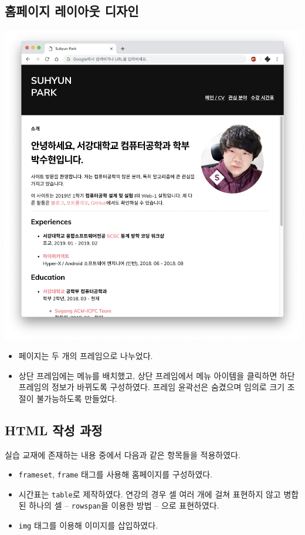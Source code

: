 \documentclass[runningheads]{llncs}
\newenvironment{Figure}
  {\par\medskip\noindent\minipage{\linewidth}}
  {\endminipage\par\medskip}
\begin{document}
\subsection{홈페이지 레이아웃 디자인}
\begin{Figure}
	\includegraphics[width=\linewidth]{web-html.png}
	\label{fig:web-html}
\end{Figure}

\begin{itemize}
	\item 페이지는 두 개의 프레임으로 나누었다.
	\item 상단 프레임에는 메뉴를 배치했고, 상단 프레임에서 메뉴 아이템을 클릭하면 하단 프레임의 정보가 바뀌도록 구성하였다. 프레임 윤곽선은 숨겼으며 임의로 크기 조절이 불가능하도록 만들었다.
\end{itemize}


\subsection{HTML 작성 과정}
실습 교재에 존재하는 내용 중에서 다음과 같은 항목들을 적용하였다.
\begin{itemize}
	\item \texttt{frameset}, \texttt{frame} 태그를 사용해 홈페이지를 구성하였다.
	\item 시간표는 \texttt{table}로 제작하였다. 연강의 경우 셀 여러 개에 걸쳐 표현하지 않고 병합된 하나의 셀 -- \texttt{rowspan}을 이용한 방법 -- 으로 표현하였다.
	\item \texttt{img} 태그를 이용해 이미지를 삽입하였다.
\end{itemize}
\end{document}
